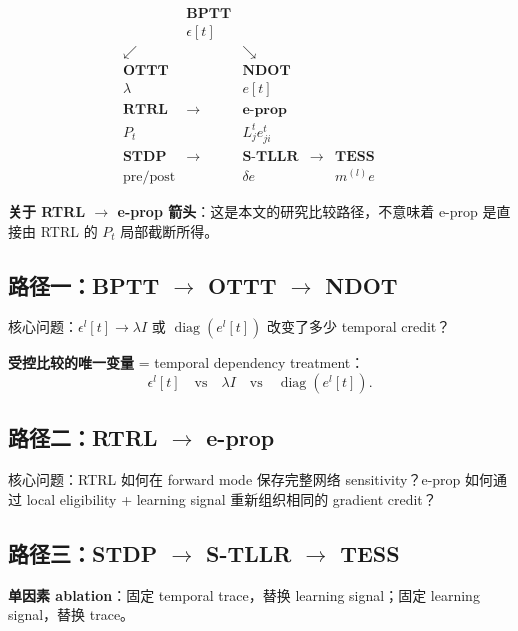 \documentclass[journal,12pt,onecolumn]{IEEEtran}
\begin{document}
\begin{equation}
\begin{array}{ccccccc}
& \textbf{BPTT} & & & & &\\
& \epsilon[t] & & & & &\\
\swarrow & & \searrow & & & &\\
\textbf{OTTT} & & \textbf{NDOT} & & & &\\
\lambda & & e[t] & & & &\\[3mm]
\textbf{RTRL} & \longrightarrow & \textbf{e-prop} & & & &\\
P_t & & L_j^t e_{ji}^t & & & &\\[3mm]
\textbf{STDP} & \longrightarrow & \textbf{S-TLLR} & \longrightarrow & \textbf{TESS} & &\\
\text{pre/post} & & \delta e & & m^{(l)}e & &
\end{array}
\end{equation}

\textbf{关于 RTRL $\to$ e-prop 箭头}：这是本文的研究比较路径，不意味着 e-prop 是直接由 RTRL 的 $P_t$ 局部截断所得。

\subsection{路径一：BPTT $\to$ OTTT $\to$ NDOT}

核心问题：$\epsilon^l[t]\to\lambda I$ 或 $\operatorname{diag}(e^l[t])$ 改变了多少 temporal credit？

\textbf{受控比较的唯一变量} = temporal dependency treatment：
\begin{equation}
\epsilon^l[t]\quad\text{vs}\quad\lambda I\quad\text{vs}\quad\operatorname{diag}(e^l[t]).
\end{equation}

\subsection{路径二：RTRL $\to$ e-prop}

核心问题：RTRL 如何在 forward mode 保存完整网络 sensitivity？e-prop 如何通过 local eligibility + learning signal 重新组织相同的 gradient credit？

\subsection{路径三：STDP $\to$ S-TLLR $\to$ TESS}

\textbf{单因素 ablation}：固定 temporal trace，替换 learning signal；固定 learning signal，替换 trace。
\end{document}
